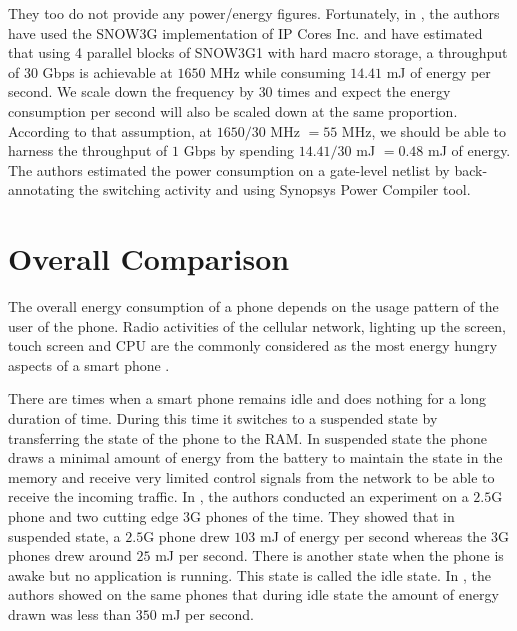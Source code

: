 \documentclass[lnicst,sechang,a4paper]{svmultln}
\begin{document}
They too do not provide any power/energy figures. Fortunately, in \cite{kolkata}, the authors have used the SNOW3G implementation of IP Cores Inc. and have estimated that using 4 parallel blocks of SNOW3G1 with hard macro storage, a throughput of 30 Gbps is achievable at $1650$ MHz while consuming $14.41$ mJ of energy per second. We scale down the frequency by $30$ times and expect the energy consumption per second will also be scaled down at the same proportion. According to that assumption, at $1650/30$ MHz $=55$ MHz, we should be able to harness the throughput of $1$ Gbps by spending $14.41/30$ mJ $=0.48$ mJ of energy. The authors estimated the power consumption on a gate-level netlist by back-annotating the switching activity and using Synopsys Power Compiler tool.

\section{Overall Comparison}
\label{sec:overall_comparison}
The overall energy consumption of a phone depends on the usage pattern of the user of the phone. Radio activities of the cellular network, lighting up the screen, touch screen and CPU are the commonly considered as the most energy hungry aspects of a smart phone \cite{Usenix_2010}. 

There are times when a smart phone remains idle and does nothing for a long duration of time. During this time it switches to a suspended state by transferring the state of the phone to the RAM. In suspended state the phone draws a minimal amount of energy from the battery to maintain the state in the memory and receive very limited control signals from the network to be able to receive the incoming traffic. In \cite{Usenix_2010}, the authors conducted an experiment on a $2.5$G phone and two cutting edge $3$G phones of the time. They showed that in suspended state, a $2.5$G phone drew $103$ mJ of energy per second whereas the 3G phones drew around $25$ mJ per second. There is another state when the phone is awake but no application is running. This state is called the idle state. In \cite{Usenix_2010}, the authors showed on the same phones that during idle state the amount of energy drawn was less than $350$ mJ per second. 
\end{document}
